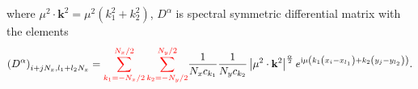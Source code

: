 \documentclass[preprint,compress,3p,10pt,fleqn]{elsarticle}
\numberwithin{equation}{section}
\newtheorem{remark}[theorem]{Remark}
\begin{document}
where $\mu^{2} \cdot \mathbf{k}^{2}=\mu^{2}\left(k_{1}^{2}+k_{2}^{2}\right)$, $D^{\alpha}$ is spectral symmetric differential matrix with the elements
\begin{align}\label{eq_54}
\left(D^{\alpha}\right)_{i+j N_{x}, l_{1}+l_{2} N_{x}}=\textcolor[rgb]{1.00,0.00,0.00}{\sum\limits_{k_{1}=-N_{x} / 2}^{N_{x} / 2} \sum\limits_{k_{2}=-N_{y} / 2}^{N_{y} / 2}}\frac{1}{N_{x} c_{k_{1}}} \frac{1}{N_{y} c_{k_{2}}}\left|\mu^{2} \cdot \mathbf{k}^{2}\right|^{\frac{\alpha}{2}} e^{\mathrm{i}\mu\left(k_{1}\left(x_{i}-x_{l_{1}}\right)+k_{2}\left(y_{j}-y_{l_{2}}\right)\right)}.
\end{align}



	
\end{document}
